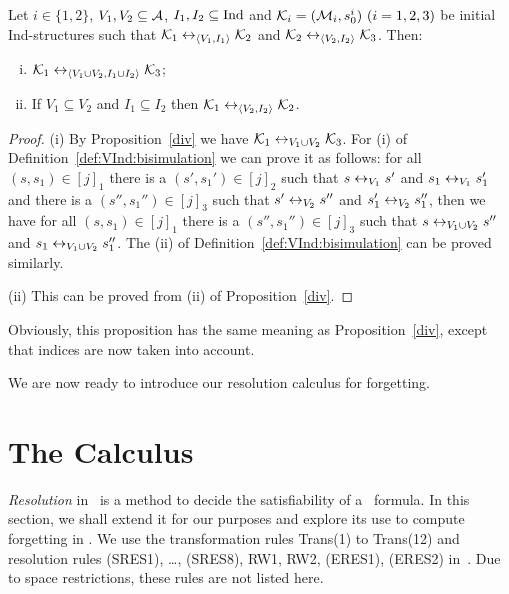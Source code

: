 \documentclass{article}
\begin{document}
\begin{proposition}\label{pro:VI:div}
Let $i\in \{1,2\}$, $V_1,V_2\subseteq\cal A$, $I_1, I_2 \subseteq \textrm{Ind}$
and ${\cal K}_i=({\cal M}_i,s_0^i)~(i=1,2,3)$ be initial Ind-structures
 such that
${\cal K}_1\leftrightarrow_{{\langle{V_1, I_1}\rangle}}{\cal K}_2$ and ${\cal K}_2\leftrightarrow_{{\langle{V_2,I_2}\rangle}}{\cal K}_3$.
 Then:
 \begin{enumerate}[(i)]
   \item ${\cal K}_1\leftrightarrow_{{\langle{V_1\cup V_2, I_1 \cup I_2}\rangle}}{\cal K}_3$;
   \item If $V_1 \subseteq V_2$ and $I_1 \subseteq I_2$ then ${\cal K}_1 \leftrightarrow_{{\langle{V_2, I_2}\rangle}} {\cal K}_2$.
 \end{enumerate}
\end{proposition}
\begin{proof}
(i) By Proposition~\ref{div} we have ${\cal K}_1\leftrightarrow_{V_1\cup V_2}{\cal K}_3$. For (i) of Definition~\ref{def:VInd:bisimulation} we can prove it as follows:
for all $(s,s_1) \in [j]_1$ there is a $(s', s_1') \in [j]_2$ such that $s\leftrightarrow_{V_1} s'$ and $s_1 \leftrightarrow_{V_1} s_1'$ and there is a $(s'', s_1'') \in [j]_3$ such that $s'\leftrightarrow_{V_2} s''$ and $s_1' \leftrightarrow_{V_2} s_1''$,  then we have for all $(s,s_1) \in [j]_1$ there is a $(s'', s_1'') \in [j]_3$ such that $s  \leftrightarrow_{V_1\cup V_2} s''$ and $s_1 \leftrightarrow_{V_1\cup V_2} s_1''$. The (ii) of Definition~\ref{def:VInd:bisimulation} can be proved similarly.

(ii) This can be proved from (ii) of Proposition~\ref{div}.
\end{proof}
Obviously, this proposition has the same meaning as Proposition~\ref{div}, except that indices are now taken into account.

We are now ready to introduce our resolution calculus for forgetting.


\section{The Calculus}
\emph{Resolution} in \CTL\ is a method to decide the satisfiability of a \CTL\ formula.
In this section, we shall extend it for our purposes and explore its use to compute forgetting in \CTL.
We use the transformation rules Trans(1) to Trans(12) and resolution rules (SRES1), \dots, (SRES8), RW1, RW2, (ERES1), (ERES2) in~\cite{zhang2009refined}. Due to space restrictions, these rules are not listed here.
\end{document}
